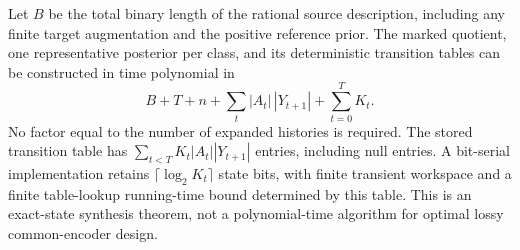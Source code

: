 \begin{theorem}\label{thm:v10-synthesis}
Let $B$ be the total binary length of the rational source description,
including any finite target augmentation and the positive reference
prior. The marked quotient, one representative posterior per class,
and its deterministic transition tables can be constructed in time
polynomial in
\[
 B+T+n+\sum_t|A_t|\,|Y_{t+1}|+\sum_{t=0}^TK_t.
\]
No factor equal to the number of expanded histories is required.
The stored transition table has
$\sum_{t<T}K_t|A_t||Y_{t+1}|$ entries, including null entries.
A bit-serial implementation retains
$\lceil\log_2K_t\rceil$ state bits, with finite transient workspace
and a finite table-lookup running-time bound determined by this table.
This is an exact-state synthesis theorem, not a polynomial-time
algorithm for optimal lossy common-encoder design.
\end{theorem}
